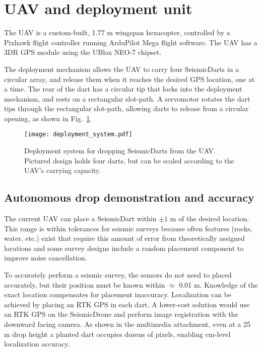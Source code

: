\section{UAV and deployment unit}\label{sec:DeploymentUnit(UAV)}

The UAV is a custom-built, 1.77 m wingspan hexacopter, controlled by a Pixhawk flight controller running ArduPilot Mega flight software. The UAV has a 3DR GPS module using the UBlox NEO-7 chipset.


 The deployment mechanism allows the UAV to carry four SeismicDarts in a circular array, and release them when it reaches the desired GPS location, one at a time.
 The rear of the dart has a circular tip that locks into the deployment mechanism, and rests on a rectangular slot-path. 
 A servomotor rotates the dart tips through the rectangular slot-path, allowing darts to release from a circular opening,  as shown in Fig.~\ref{fig:deployment_system}.



\begin{figure} \centering
  {\texttt{[image: deployment\_system.pdf]}}
 \caption{Deployment system for dropping SeismicDarts from the UAV. Pictured design holds four darts, but can be scaled according to the UAV's carrying capacity.} 
 \label{fig:deployment_system}
\end{figure}




\subsection{Autonomous drop demonstration and accuracy}

The current UAV can place a SeismicDart within $\pm1$ m of the desired location.  
This range is within tolerances for seismic surveys because often features (rocks, water, etc.) exist that require this amount of error from theoretically assigned locations and some survey designs include a random placement component to improve noise cancellation.

To accurately perform a seismic survey, the sensors do not need to placed accurately, but their position must be known within $\approx$ 0.01 m. 
 Knowledge of the exact location compensates for placement inaccuracy.
 Localization can be achieved by placing an RTK GPS in each dart.  A lower-cost solution would use an RTK GPS on the SeismicDrone and perform image registration with the downward facing camera.  As shown in the multimedia attachment, even at a 25 m drop height a planted dart occupies dozens of pixels, enabling cm-level localization accuracy.


